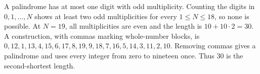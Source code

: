 A palindrome has at most one digit with odd multiplicity. Counting the digits in $0,1,\ldots,N$ shows at least two odd multiplicities for every $1\le N\le18$, so none is possible. At $N=19$, all multiplicities are even and the length is $10+10\cdot2=30$. A construction, with commas marking whole-number blocks, is $0,12,1,13,4,15,6,17,8,19,9,18,7,16,5,14,3,11,2,10$. Removing commas gives a palindrome and uses every integer from zero to nineteen once. Thus $\boxed{30}$ is the second-shortest length.
